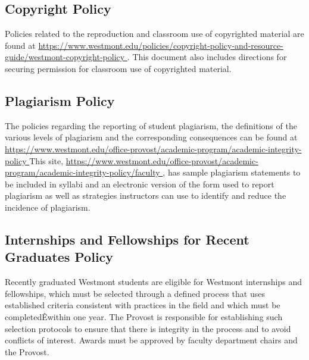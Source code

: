 	\subsection{Copyright Policy}
		Policies related to the reproduction and classroom use of copyrighted
		material are found at
		\href{
			https://www.westmont.edu/policies/copyright-policy-and-resource-guide/westmont-copyright-policy
		}{\url{
				https://www.westmont.edu/policies/copyright-policy-and-resource-guide/westmont-copyright-policy
			}}
		.
		This document also includes directions for securing permission for classroom use of copyrighted material.
	\subsection{Plagiarism Policy}
		The policies regarding the reporting of student plagiarism, the definitions
		of the various levels of plagiarism and the corresponding consequences can be
		found at
		\href{
			https://www.westmont.edu/office-provost/academic-program/academic-integrity-policy
		}
		{\url{
				https://www.westmont.edu/office-provost/academic-program/academic-integrity-policy
			}}
		This site,
		\href{
			https://www.westmont.edu/office-provost/academic-program/academic-integrity-policy/faculty
		}
		{\url{
				https://www.westmont.edu/office-provost/academic-program/academic-integrity-policy/faculty
			}},
		has sample plagiarism statements to be included
		in syllabi and an electronic version of the form used to report plagiarism as well as strategies instructors can use to identify and reduce the incidence of plagiarism.
	\subsection{Internships and Fellowships for Recent Graduates Policy}
		Recently graduated Westmont students are eligible for Westmont internships and fellowships, which must be selected through a defined process that uses established criteria consistent with practices in the field and which must be completedÊwithin one year. The Provost is responsible for establishing such selection protocols to ensure that there is integrity in the process and to avoid conflicts of interest. Awards must be approved by faculty department chairs and the Provost.
